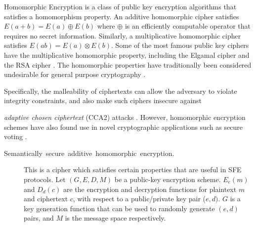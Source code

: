 Homomorphic Encryption is a class of public key encryption algorithms
that satisfies a homomorphism property. An additive homomorphic cipher
satisfies $E(a+b)=E(a)\oplus E(b)$ where $\oplus$ is an efficiently
computable operator that requires no secret information. Similarly,
a multiplicative homomorphic cipher satisfies $E(ab)=E(a)\otimes E(b)$.
Some of the most famous public key ciphers have the multiplicative
homomorphic property, including the Elgamal cipher \cite{elgamal85}
and the RSA cipher \cite{rivest83rsa}. The homomorphic properties
have traditionally been considered undesirable for general purpose
cryptography \cite{jmsw02}. %
\begin{comment}
mention Cramer-Shoup?
\end{comment}
{}Specifically, the malleability of ciphertexts can allow the adversary
to violate integrity constraints, and also make such ciphers insecure
against %
\begin{comment}
 because the homomorphic structure aids in cryptanalysis and allows
encrypted messages to be modified, violating integrity constraints.
\cite{jmsw02}. This leads to insecurity against
\end{comment}
{}\emph{adaptive chosen ciphertext} (CCA2) attacks \cite{bleichenbacher98chosen}.
However, homomorphic encryption schemes have also found use in novel
cryptographic applications such as secure voting \cite{benaloh94}. 
\begin{description}
\item [{Semantically~secure~additive~homomorphic~encryption.}] This
is a cipher which satisfies certain properties that are useful in
SFE protocols. Let $(G,E,D,M)$ be a public-key encryption scheme.
$E_{e}(m)$ and $D_{d}(c)$ are the encryption and decryption functions
for plaintext $m$ and ciphertext $c$, with respect to a public/private
key pair ($e,d)$. $G$ is a key generation function that can be used
to randomly generate $(e,d)$ pairs, and $M$ is the message space
respectively. \end{description}
